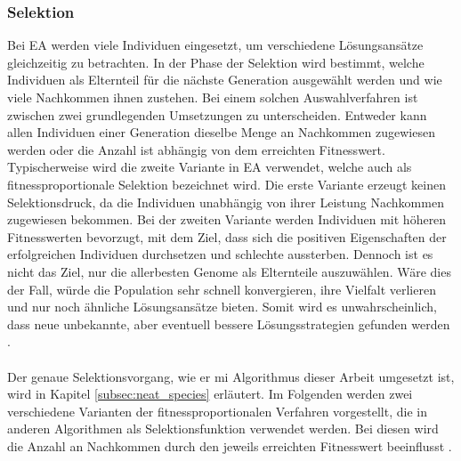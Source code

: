 \subsubsection{Selektion}
\label{subsubsec:ea_selection}
Bei \ac{EA} werden viele Individuen eingesetzt, um verschiedene Lösungsansätze gleichzeitig zu betrachten. In der Phase der Selektion wird bestimmt, welche Individuen als Elternteil für die nächste Generation ausgewählt werden und wie viele Nachkommen ihnen zustehen. Bei einem solchen Auswahlverfahren ist zwischen zwei grundlegenden Umsetzungen zu unterscheiden. Entweder kann allen Individuen einer Generation dieselbe Menge an Nachkommen zugewiesen werden oder die Anzahl ist abhängig von dem erreichten Fitnesswert. Typischerweise wird die zweite Variante in \ac{EA} verwendet, welche auch als fitnessproportionale Selektion bezeichnet wird. Die erste Variante erzeugt keinen Selektionsdruck, da die Individuen unabhängig von ihrer Leistung Nachkommen zugewiesen bekommen. Bei der zweiten Variante werden Individuen mit höheren Fitnesswerten bevorzugt, mit dem Ziel, dass sich die positiven Eigenschaften der erfolgreichen Individuen durchsetzen und schlechte aussterben. Dennoch ist es nicht das Ziel, nur die allerbesten Genome als Elternteile auszuwählen. Wäre dies der Fall, würde die Population sehr schnell konvergieren, ihre Vielfalt verlieren und nur noch ähnliche Lösungsansätze bieten. Somit wird es unwahrscheinlich, dass neue unbekannte, aber eventuell bessere Lösungsstrategien gefunden werden \cite{weicker2015evolutionare}. 
\\\\
Der genaue Selektionsvorgang, wie er mi Algorithmus dieser Arbeit umgesetzt ist, wird in Kapitel \ref{subsec:neat_species} erläutert. Im Folgenden werden zwei verschiedene Varianten der fitnessproportionalen Verfahren vorgestellt, die in anderen Algorithmen als Selektionsfunktion verwendet werden. Bei diesen wird die Anzahl an Nachkommen durch den jeweils erreichten Fitnesswert beeinflusst \cite{weicker2015evolutionare}.


